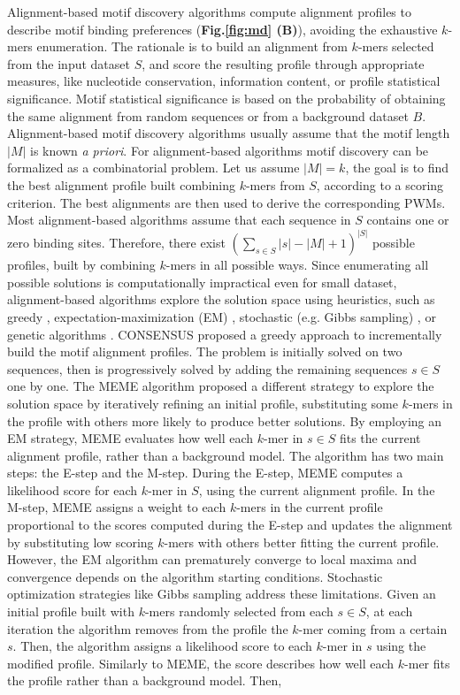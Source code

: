 \documentclass[a4paper, titlepage, 8pt, openright]{book}
\begin{document}
Alignment-based motif discovery algorithms compute alignment profiles to describe motif binding preferences (\textbf{Fig.\ref{fig:md} (B)}), avoiding the exhaustive $k$-mers enumeration. The rationale is to build an alignment from $k$-mers selected from the input dataset $S$, and score the resulting profile through appropriate measures, like nucleotide conservation, information content, or profile statistical significance. Motif statistical significance is based on the probability of obtaining the same alignment from random sequences or from a background dataset $B$. Alignment-based motif discovery algorithms usually assume that the motif length $|M|$ is known \emph{a priori}. For alignment-based algorithms motif discovery can be formalized as a combinatorial problem. Let us assume $|M|=k$, the goal is to find the best alignment profile built combining $k$-mers from $S$, according to a scoring criterion. The best alignments are then used to derive the corresponding PWMs. Most alignment-based algorithms assume that each sequence in $S$ contains one or zero binding sites. Therefore, there exist $(\sum_{s \in S}{|s|} - |M| + 1)^{|S|}$  possible profiles, built by combining $k$-mers in all possible ways. Since enumerating all possible solutions is computationally impractical even for small dataset, alignment-based algorithms explore the solution space using heuristics, such as greedy \citep{hertz1999identifying}, expectation-maximization (EM) \citep{bailey1994fitting}, stochastic (e.g. Gibbs sampling) \citep{lawrence1993detecting}, or genetic algorithms \citep{lee2018comprehensive}. CONSENSUS \citep{hertz1999identifying} proposed a greedy approach to incrementally build the motif alignment profiles. The problem is initially solved on two sequences, then is progressively solved by adding the remaining sequences $s \in S$ one by one. The MEME algorithm \citep{bailey1994fitting,bailey1995value,bailey2006meme} proposed a different strategy to explore the solution space by iteratively refining an initial profile, substituting some $k$-mers in the profile with others more likely to produce better solutions. By employing an EM strategy, MEME evaluates how well each $k$-mer in $s \in S$ fits the current alignment profile, rather than a background model. The algorithm has two main steps: the E-step and the M-step. During the E-step, MEME computes a likelihood score for each $k$-mer in $S$, using the current alignment profile. In the M-step, MEME assigns a weight to each $k$-mers in the current profile proportional to the scores computed during the E-step and updates the alignment by substituting low scoring $k$-mers with others better fitting the current profile. However, the EM algorithm can prematurely converge to local maxima and convergence depends on the algorithm starting conditions. Stochastic optimization strategies like Gibbs sampling \citep{lawrence1990expectation} address these limitations. Given an initial profile built with $k$-mers randomly selected from each $s \in S$, at each iteration the algorithm removes from the profile the $k$-mer coming from a certain $s$. Then, the algorithm assigns a likelihood score to each $k$-mer in $s$ using the modified profile. Similarly to MEME, the score describes how well each $k$-mer fits the profile rather than a background model. Then, 
\end{document}

